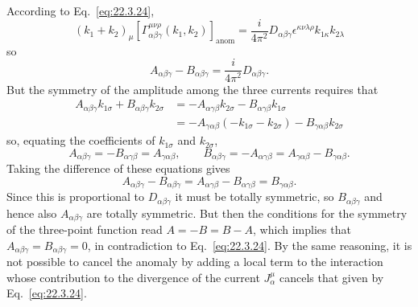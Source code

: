 According to Eq.~\eqref{eq:22.3.24},
\[
 (k_1+k_2)_\mu
 \left[
  \Gamma_{\alpha\beta\gamma}^{\mu\nu\rho}(k_1,k_2)
 \right]_{\mathrm{anom}}
 =\frac{i}{4\pi^2}D_{\alpha\beta\gamma}
 \epsilon^{\kappa\nu\lambda\rho}k_{1\kappa}k_{2\lambda}
\]
so
\[
 A_{\alpha\beta\gamma}-B_{\alpha\beta\gamma}
 =\frac{i}{4\pi^2}D_{\alpha\beta\gamma}.
\]
But the symmetry of the amplitude among the three currents requires that
\[
 \begin{aligned}
 A_{\alpha\beta\gamma}k_{1\sigma}
 +B_{\alpha\beta\gamma}k_{2\sigma}
 &=-A_{\alpha\gamma\beta}k_{2\sigma}
   -B_{\alpha\gamma\beta}k_{1\sigma}
 \\
 &=-A_{\gamma\alpha\beta}(-k_{1\sigma}-k_{2\sigma})
   -B_{\gamma\alpha\beta}k_{2\sigma}
 \end{aligned}
\]
so, equating the coefficients of $k_{1\sigma}$ and $k_{2\sigma}$,
\[
 A_{\alpha\beta\gamma}=-B_{\alpha\gamma\beta}
 =A_{\gamma\alpha\beta},
 \qquad
 B_{\alpha\beta\gamma}=-A_{\alpha\gamma\beta}
 =A_{\gamma\alpha\beta}-B_{\gamma\alpha\beta}.
\]
Taking the difference of these equations gives
\[
 A_{\alpha\beta\gamma}-B_{\alpha\beta\gamma}
 =A_{\alpha\gamma\beta}-B_{\alpha\gamma\beta}
 =B_{\gamma\alpha\beta}.
\]
Since this is proportional to $D_{\alpha\beta\gamma}$ it must be totally
symmetric, so $B_{\alpha\beta\gamma}$ and hence also
$A_{\alpha\beta\gamma}$ are totally symmetric. But then the conditions for
the symmetry of the three-point function read $A=-B=B-A$, which implies
that $A_{\alpha\beta\gamma}=B_{\alpha\beta\gamma}=0$, in contradiction to
Eq.~\eqref{eq:22.3.24}. By the same reasoning, it is not possible to cancel
the anomaly by adding a local term to the interaction whose contribution to
the divergence of the current $J_\alpha^\mu$ cancels that given by
Eq.~\eqref{eq:22.3.24}.

